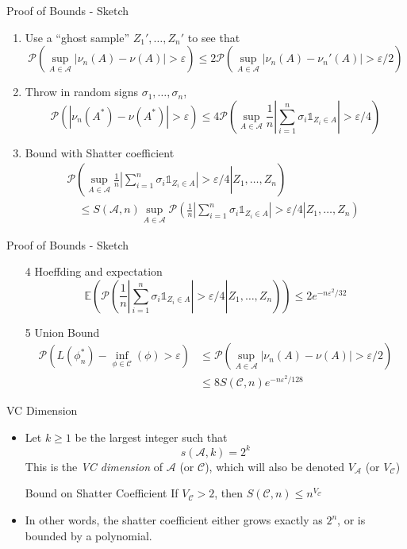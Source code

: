 \documentclass{beamer}
\renewcommand{\Pr}[1]{\mathcal{P} \left( #1 \right)}
\newcommand{\cls}{\mathcal{C}}
\newcommand{\E}[1]{\mathbb{E}\left( #1 \right)}
\newcommand{\abs}[1]{\left| #1 \right|}
\newcommand{\eps}{\varepsilon}
\begin{document}
\begin{frame}{Proof of Bounds - Sketch}
\begin{enumerate}
\item Use a ``ghost sample'' $Z_1', \ldots, Z_n'$ to see that
\[ \Pr{ \sup_{A \in \mathcal{A}} \abs{\nu_n(A) - \nu(A)} > \eps} \leq 2\Pr{ \sup_{A \in \mathcal{A}} \abs{\nu_n(A) - \nu_n'(A)} > \eps/2}\]
\item Throw in random signs $\sigma_1,\ldots,\sigma_n$,
\[ \Pr{ \abs{\nu_n(A^*) - \nu(A^*)} > \eps} \leq 4 \Pr{\sup_{A\in\mathcal{A}} \frac1n\abs{\sum_{i=1}^n \sigma_i \mathds{1}_{Z_i \in A}} > \eps/4 }\]
\item Bound with Shatter coefficient
\begin{align*}
\Pr{\left.\sup_{A\in\mathcal{A}} \frac1n\abs{\sum_{i=1}^n \sigma_i \mathds{1}_{Z_i \in A}} > \eps/4 \right| Z_1,\ldots, Z_n} \quad\quad\quad\quad\quad\quad\quad\\
\quad \leq S(\mathcal{A}, n)\sup_{A \in \mathcal{A}} \Pr{\left.\frac1n \abs{\sum_{i=1}^n \sigma_i \mathds{1}_{Z_i \in A}} > \eps/4 \right| Z_1,\ldots,Z_n} \end{align*}
\end{enumerate}
\end{frame}

\begin{frame}{Proof of Bounds - Sketch}
\begin{enumerate}
\item[4] Hoeffding and expectation
\[ \E{\Pr{\left.\frac1n \abs{\sum_{i=1}^n \sigma_i \mathds{1}_{Z_i \in A}} > \eps/4 \right| Z_1,\ldots,Z_n}} \leq 2e^{-n\eps^2/32} \]
\item[5] Union Bound
\begin{align*}
  \Pr{ L(\phi^*_n) - \inf_{\phi \in \cls}(\phi) > \eps} & \leq \Pr{ \sup_{A \in \mathcal{A}} \abs{\nu_n(A) - \nu(A)} > \eps/2} \\
	& \leq 8 S(\cls,n)e^{-n\eps^2/128}\end{align*}
\end{enumerate}
\end{frame}

\begin{frame}{VC Dimension}
\begin{itemize}
\item Let $k \geq 1$ be the largest integer such that
\[ s(\mathcal A, k) = 2^k \]
This is the \emph{VC dimension} of $\mathcal A$ (or $\cls$), which will also be denoted $V_{\mathcal A}$ (or $V_\cls$)
\begin{block}{Bound on Shatter Coefficient}
If $V_\cls > 2$, then $S(\cls, n) \leq n^{V_\cls}$
\end{block}
\item In other words, the shatter coefficient either grows exactly as $2^n$, or is bounded by a polynomial.
\end{itemize}
\end{frame}
\end{document}
